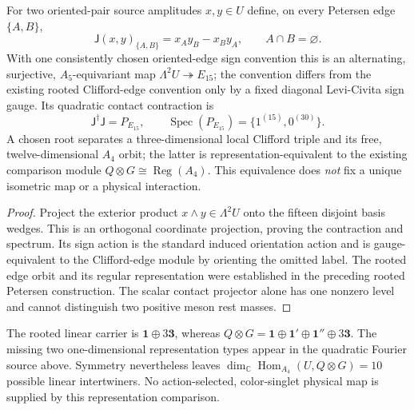 \documentclass[12pt,a4paper]{article}
\begin{document}
\begin{proposition}
\label{p5:prop:v338-bilinear-edge-map}
For two oriented-pair source amplitudes $x,y\in U$ define, on every
Petersen edge $\{A,B\}$,
\[
 \mathsf J(x,y)_{\{A,B\}}=x_Ay_B-x_By_A,
 \qquad A\cap B=\varnothing.
\]
With one consistently chosen oriented-edge sign convention this is
an alternating, surjective, $A_5$-equivariant map
$\Lambda^2U\twoheadrightarrow E_{15}$; the convention differs
from the existing rooted Clifford-edge convention only by a fixed
diagonal Levi-Civita sign gauge.  Its quadratic contact contraction is
\[
 \mathsf J^\dagger\mathsf J=P_{E_{15}},\qquad
 \operatorname{Spec}(P_{E_{15}})=\{1^{(15)},0^{(30)}\}.
\]
A chosen root separates a three-dimensional local Clifford triple
and its free, twelve-dimensional $A_4$ orbit; the latter is
representation-equivalent to the existing comparison module
$Q\otimes G\cong\operatorname{Reg}(A_4)$.  This equivalence does
\emph{not} fix a unique isometric map or a physical interaction.
\end{proposition}
\begin{proof}
Project the exterior product $x\wedge y\in\Lambda^2U$ onto the
fifteen disjoint basis wedges.  This is an orthogonal coordinate
projection, proving the contraction and spectrum.  Its sign action
is the standard induced orientation action and is gauge-equivalent
to the Clifford-edge module by orienting the omitted label.
The rooted edge orbit and its regular representation were established
in the preceding rooted Petersen construction.  The scalar contact
projector alone has one nonzero level and cannot distinguish two
positive meson rest masses.
\end{proof}
\begin{remark}
The rooted linear carrier is $\mathbf1\oplus3\mathbf3$, whereas
$Q\otimes G=\mathbf1\oplus\mathbf1'\oplus\mathbf1''\oplus3\mathbf3$.
The missing two one-dimensional representation types appear in the
quadratic Fourier source above.  Symmetry nevertheless leaves
$\dim_{\mathbb C}\operatorname{Hom}_{A_4}(U,Q\otimes G)=10$
possible linear intertwiners.  No action-selected, color-singlet
physical map is supplied by this representation comparison.
\end{remark}



\clearpage
\end{document}
